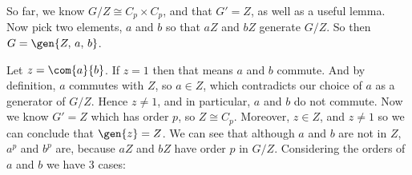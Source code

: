 So far, we know \(G/Z \cong C_p \times C_p\), and that \(G' = Z\), as well as a useful lemma.
Now pick two elements, \(a\) and \(b\) so that \(aZ\) and \(bZ\) generate \(G/Z\).
So then \(G = \gen{Z,\,a,\,b}\).

Let \(z = \com{a}{b}\).
If \(z = 1\) then that means \(a\) and \(b\) commute.
And by definition, \(a\) commutes with \(Z\), so \(a \in Z\), which contradicts our choice of \(a\) as a generator of
\(G/Z\).
Hence \(z \neq 1\), and in particular, \(a\) and \(b\) do not commute.
Now we know \(G' = Z\) which has order \(p\), so \(Z \cong C_p\).
Moreover, \(z \in Z\), and \(z \neq 1\) so we can conclude that \(\gen{z} = Z\).
We can see that although \(a\) and \(b\) are not in \(Z\), \(a^p\) and \(b^p\) are, because \(aZ\) and \(bZ\) have order
\(p\) in \(G/Z\).
Considering the orders of \(a\) and \(b\) we have 3 cases:

